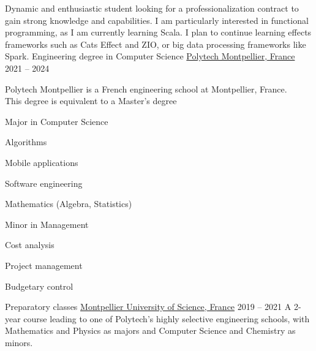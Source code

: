 \documentclass[11pt]{spidercv}
\begin{document}
\begin{MainPart}

  \color{Black}
  \vspace{0.25cm}
  Dynamic and enthusiastic student looking for a professionalization contract to gain strong knowledge and capabilities. I am particularly interested in functional programming, as I am currently learning Scala. I plan to continue learning effects frameworks such as Cats Effect and ZIO, or big data processing frameworks like Spark.
  \Experience
  {\ColorHighlight}
  {Engineering degree in Computer Science}
  {\href{https://english.polytech.umontpellier.fr/}{Polytech Montpellier, France}}
  {2021 -- 2024}
  {
    Polytech Montpellier is a French engineering school at Montpellier, France.\\
    This degree is equivalent to a Master's degree

    \begin{multicols}{2}
      Major in Computer Science
      \begin{ItemList}{\ColorHighlight}
        \item [\ding{226}] Algorithms
        \item [\ding{226}] Mobile applications
        \item [\ding{226}] Software engineering
        \item [\ding{226}] Mathematics (Algebra, Statistics)
      \end{ItemList}
      \columnbreak
      Minor in Management
      \begin{ItemList}{\ColorHighlight}
        \item [\ding{226}] Cost analysis
        \item [\ding{226}] Project management
        \item [\ding{226}] Budgetary control
      \end{ItemList}
    \end{multicols}
  }
  \Experience
  {\ColorHighlight}
  {Preparatory classes}
  {\href{https://www.umontpellier.fr/en/}{Montpellier University of Science, France}}
  {2019 -- 2021}
  {
    A 2-year course leading to one of Polytech's highly selective engineering schools, with Mathematics and Physics as majors and Computer Science and Chemistry as minors.
  }


\end{MainPart}
\end{document}
